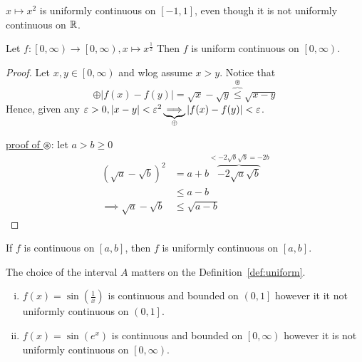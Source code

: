 \begin{remark*}
    $x \mapsto x^2$ is uniformly continuous on $\left[-1, 1\right]$, even though it is not uniformly continuous on $\mathbb R$. 
\end{remark*}

\begin{example}
    Let $f: \left[0, \infty\right) \to \left[0, \infty\right), x \mapsto x^{\frac{1}{2}}$ 
    Then $f$ is uniform continuous on $\left[0, \infty\right)$.
\end{example}

\begin{proof}
    Let $x, y \in \left[0, \infty\right)$ and wlog assume $x > y$. Notice that 
    $$\oplus |f(x) - f(y)| = \sqrt{x} - \sqrt{y} \overbrace{\leq}^{\circledast } \sqrt{x-y}$$
    Hence, given any $\varepsilon > 0, |x-y| < \varepsilon^2 \underbrace{\implies}_{\oplus} |f(x) - f(y)| < \varepsilon$.

    \underline{proof of $\circledast$}: let $a > b \geq 0$
    \begin{align*}
    (\sqrt{a} - \sqrt{b})^2 &= a + b \overbrace{- 2\sqrt{a}\sqrt{b}}^{ < -2\sqrt{b}\sqrt{b} = -2b} \\
    &\leq a - b \\
    \implies \sqrt{a} - \sqrt{b} &\leq \sqrt{a - b}
    \end{align*}
\end{proof}

\begin{theorem}
    If $f$ is continuous on $\left[a, b\right]$, then $f$ is uniformly continuous on $\left[a, b\right]$.
\end{theorem}

The choice of the interval $A$ matters on the Definition~\ref{def:uniform}.

\begin{example}
    \text{ }
    \begin{enumerate}[(i)]
        \item $f(x) = \sin\left(\frac{1}{x}\right)$ is continuous and bounded on $\left(0, 1\right]$ however it it not uniformly continuous on $\left(0, 1\right]$.
        \item $f(x) = \sin\left(e^x\right)$ is continuous and bounded on $\left[0, \infty\right)$ however it is not uniformly continuous on $\left[0, \infty\right)$. 
    \end{enumerate}
\end{example}
